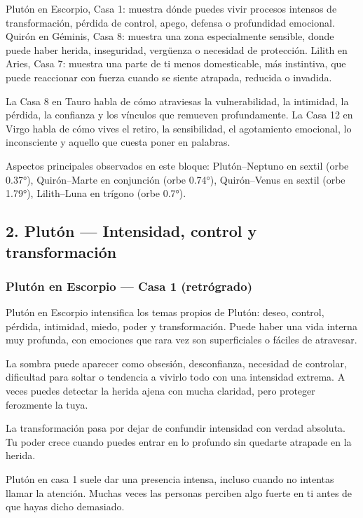 \documentclass[11pt,a4paper]{article}
\begin{document}
Plutón en Escorpio, Casa 1: muestra dónde puedes vivir procesos intensos de transformación, pérdida de control, apego, defensa o profundidad emocional.
Quirón en Géminis, Casa 8: muestra una zona especialmente sensible, donde puede haber herida, inseguridad, vergüenza o necesidad de protección.
Lilith en Aries, Casa 7: muestra una parte de ti menos domesticable, más instintiva, que puede reaccionar con fuerza cuando se siente atrapada, reducida o invadida.

La Casa 8 en Tauro habla de cómo atraviesas la vulnerabilidad, la intimidad, la pérdida, la confianza y los vínculos que remueven profundamente.
La Casa 12 en Virgo habla de cómo vives el retiro, la sensibilidad, el agotamiento emocional, lo inconsciente y aquello que cuesta poner en palabras.

Aspectos principales observados en este bloque: Plutón–Neptuno en sextil (orbe 0.37°), Quirón–Marte en conjunción (orbe 0.74°), Quirón–Venus en sextil (orbe 1.79°), Lilith–Luna en trígono (orbe 0.7°).

\vspace{0.4cm}

\subsection{2. Plutón — Intensidad, control y transformación}

\subsubsection*{Plutón en Escorpio — Casa 1 (retrógrado)}

Plutón en Escorpio intensifica los temas propios de Plutón: deseo, control, pérdida, intimidad, miedo, poder y transformación. Puede haber una vida interna muy profunda, con emociones que rara vez son superficiales o fáciles de atravesar.

La sombra puede aparecer como obsesión, desconfianza, necesidad de controlar, dificultad para soltar o tendencia a vivirlo todo con una intensidad extrema. A veces puedes detectar la herida ajena con mucha claridad, pero proteger ferozmente la tuya.

La transformación pasa por dejar de confundir intensidad con verdad absoluta. Tu poder crece cuando puedes entrar en lo profundo sin quedarte atrapade en la herida.

Plutón en casa 1 suele dar una presencia intensa, incluso cuando no intentas llamar la atención. Muchas veces las personas perciben algo fuerte en ti antes de que hayas dicho demasiado.
\end{document}
